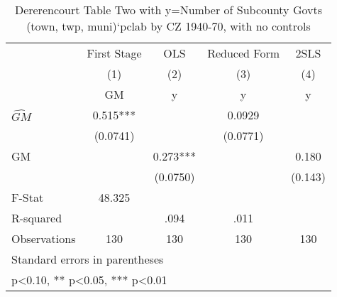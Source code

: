 \begin{table}[htbp]\centering
\def\sym#1{\ifmmode^{#1}\else\(^{#1}\)\fi}
\caption{Dererencourt Table Two with y=Number of Subcounty Govts (town, twp, muni)`pclab by CZ 1940-70, with no controls}
\begin{tabular}{l*{4}{c}}
\toprule
                    & First Stage   &         OLS   &Reduced Form   &        2SLS   \\
                    &\multicolumn{1}{c}{(1)}&\multicolumn{1}{c}{(2)}&\multicolumn{1}{c}{(3)}&\multicolumn{1}{c}{(4)}\\
                    &\multicolumn{1}{c}{GM}&\multicolumn{1}{c}{y}&\multicolumn{1}{c}{y}&\multicolumn{1}{c}{y}\\
\midrule
$\hat{GM}$          &       0.515***&               &      0.0929   &               \\
                    &    (0.0741)   &               &    (0.0771)   &               \\
\addlinespace
GM                  &               &       0.273***&               &       0.180   \\
                    &               &    (0.0750)   &               &     (0.143)   \\
\midrule
F-Stat              &      48.325   &               &               &               \\
R-squared           &               &        .094   &        .011   &               \\
Observations        &         130   &         130   &         130   &         130   \\
\bottomrule
\multicolumn{5}{l}{\footnotesize Standard errors in parentheses}\\
\multicolumn{5}{l}{\footnotesize * p<0.10, ** p<0.05, *** p<0.01}\\
\end{tabular}
\end{table}
